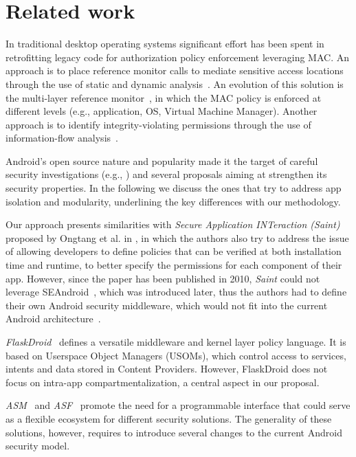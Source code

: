 \section{Related work}\label{sect:seapp_relwork}

In traditional desktop operating systems significant effort has been
spent in retrofitting legacy code for authorization policy enforcement
leveraging MAC.  An approach is to place reference monitor calls to
mediate sensitive access locations through the use of static and
dynamic analysis~\cite{seapp_jaeger_retro, seapp_jaeger_hook}.  An
evolution of this solution is the multi-layer reference
monitor~\cite{seapp_jaeger_web}, in which the MAC policy is enforced
at different levels (e.g., application, OS, Virtual Machine Manager).
Another approach is to identify integrity-violating permissions
through the use of information-flow analysis~\cite{seapp_jaeger_flow}.

Android's open source nature and popularity made it the target of
careful security investigations (e.g., \cite{seapp_sok_android,
  seapp_10.1007/978-3-319-20550-2_15, seapp_4768655,
  seapp_10.5555/2028067.2028088}) and several proposals aiming at
strengthen its security properties.  In the following we discuss the
ones that try to address app isolation and modularity, underlining the
key differences with our methodology.

Our approach presents similarities with {\em Secure Application
  INTeraction (Saint)} proposed by Ongtang et al. in
\cite{seapp_semantically_rich}, in which the authors also try to
address the issue of allowing developers to define policies that can
be verified at both installation time and runtime, to better specify
the permissions for each component of their app.  However, since the
paper has been published in 2010, {\em Saint} could not leverage
SEAndroid~\cite{seapp_seandroid}, which was introduced later, thus the
authors had to define their own Android security middleware, which
would not fit into the current Android
architecture~\cite{seapp_tapsm_m}.

{\em FlaskDroid}~\cite{seapp_flaskdroid} defines a versatile
middleware and kernel layer policy language.  It is based on Userspace
Object Managers (USOMs), which control access to services, intents and
data stored in Content Providers.  However, FlaskDroid does not focus
on intra-app compartmentalization, a central aspect in our proposal.

{\em ASM}~\cite{seapp_asm} and {\em ASF}~\cite{seapp_flaskdroid2}
promote the need for a programmable interface that could serve as a
flexible ecosystem for different security solutions. The generality of
these solutions, however, requires to introduce several changes to the
current Android security model.

